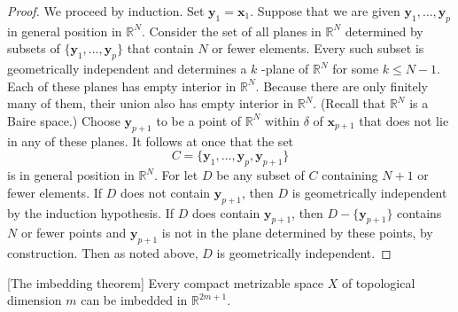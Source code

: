 \begin{proof}
We proceed by induction. Set \(\mathbf{y}_{1} = \mathbf{x}_{1}\). Suppose that we are given \(\mathbf{y}_{1},\ldots ,\mathbf{y}_{p}\) in general position in \(\mathbb{R}^{N}\). Consider the set of all planes in \(\mathbb{R}^{N}\) determined by subsets of \(\{ {\mathbf{y}_{1},\ldots ,\mathbf{y}_{p}}\}\) that contain \(N\) or fewer elements. Every such subset is geometrically independent and determines a \(k\) -plane of \(\mathbb{R}^{N}\) for some \(k \leq N - 1\). Each of these planes has empty interior in \(\mathbb{R}^{N}\). Because there are only finitely many of them, their union also has empty interior in \(\mathbb{R}^{N}\). (Recall that \(\mathbb{R}^{N}\) is a Baire space.) Choose \(\mathbf{y}_{p + 1}\) to be a point of \(\mathbb{R}^{N}\) within \(\delta\) of \(\mathbf{x}_{p + 1}\) that does not lie in any of these planes. It follows at once that the set
\[
C = \{ {\mathbf{y}_{1},\ldots ,\mathbf{y}_{p},\mathbf{y}_{p + 1}}\}
\]
is in general position in \(\mathbb{R}^{N}\). For let \(D\) be any subset of \(C\) containing \(N + 1\) or fewer elements. If \(D\) does not contain \(\mathbf{y}_{p + 1}\), then \(D\) is geometrically independent by the induction hypothesis. If \(D\) does contain \(\mathbf{y}_{p + 1}\), then \(D - \{ \mathbf{y}_{p + 1}\}\) contains \(N\) or fewer points and \(\mathbf{y}_{p + 1}\) is not in the plane determined by these points, by construction. Then as noted above, \(D\) is geometrically independent.
\end{proof}
\begin{theorem}
\label{thm:\thetheorem}[The imbedding theorem]
Every compact metrizable space \(X\) of topological dimension \(m\) can be imbedded in \(\mathbb{R}^{{2m} + 1}\).
\end{theorem}

